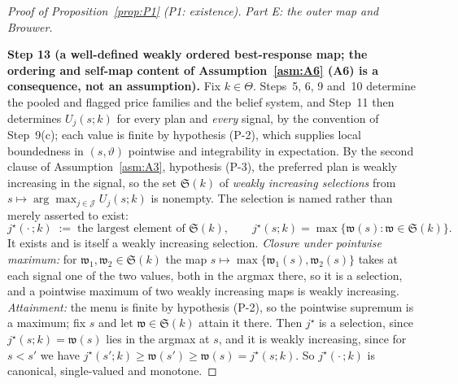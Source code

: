 \documentclass[11pt]{article}
\begin{document}
\begin{proof}[Proof of Proposition~\ref{prop:P1} (P1: existence)]
\medskip
\noindent\emph{Part E: the outer map and Brouwer.}

\smallskip
\noindent\textbf{Step 13 (a well-defined weakly ordered best-response map; the ordering and self-map
content of Assumption~\ref{asm:A6} (A6) is a consequence, not an assumption).}
Fix $k \in \Theta$. Steps~5, 6, 9 and~10 determine the pooled and flagged price families and the
belief system, and Step~11 then determines $U_j(s;k)$ for every plan and \emph{every} signal, by the
convention of Step~9(c); each value is finite by hypothesis (P-2), which supplies local boundedness
in $(s,\vartheta)$ pointwise and integrability in expectation. By the second clause of
Assumption~\ref{asm:A3}, hypothesis (P-3), the preferred plan is weakly increasing in the signal, so
the set $\mathfrak S(k)$ of \emph{weakly increasing selections} from
$s \mapsto \arg\max_{j \in \mathcal J} U_j(s;k)$ is nonempty. The selection is named rather than
merely asserted to exist:
\begin{equation}
\label{eq:P1-jstar}
j^\star(\cdot\,;k) \;:=\; \text{the largest element of } \mathfrak S(k),
\qquad
j^\star(s;k) = \max\bigl\{\mathfrak w(s) : \mathfrak w \in \mathfrak S(k)\bigr\}.
\end{equation}
It exists and is itself a weakly increasing selection. \emph{Closure under pointwise maximum:} for
$\mathfrak w_1,\mathfrak w_2 \in \mathfrak S(k)$ the map $s \mapsto \max\{\mathfrak w_1(s),
\mathfrak w_2(s)\}$ takes at each signal one of the two values, both in the argmax there, so it is a
selection, and a pointwise maximum of two weakly increasing maps is weakly increasing.
\emph{Attainment:} the menu is finite by hypothesis (P-2), so the pointwise supremum is a maximum;
fix $s$ and let $\mathfrak w \in \mathfrak S(k)$ attain it there. Then $j^\star$ is a selection, since
$j^\star(s;k) = \mathfrak w(s)$ lies in the argmax at $s$, and it is weakly increasing, since for
$s < s'$ we have $j^\star(s';k) \ge \mathfrak w(s') \ge \mathfrak w(s) = j^\star(s;k)$. So
$j^\star(\cdot\,;k)$ is canonical, single-valued and monotone.


\end{proof}
\end{document}
